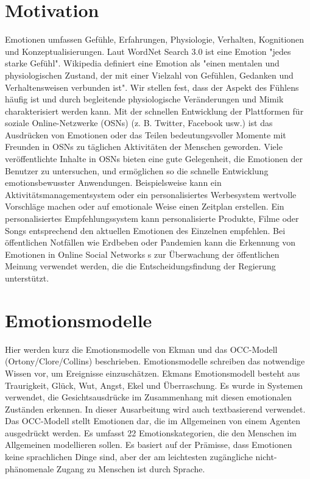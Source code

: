 \documentclass[conference]{IEEEtran}
\begin{document}
\section{Motivation}
Emotionen umfassen Gefühle, Erfahrungen, Physiologie, Verhalten, Kognitionen und Konzeptualisierungen. Laut WordNet Search 3.0 ist eine Emotion "jedes starke Gefühl". Wikipedia definiert eine Emotion als "einen mentalen und physiologischen Zustand, der mit einer Vielzahl von Gefühlen, Gedanken und Verhaltensweisen verbunden ist". Wir stellen fest, dass der Aspekt des Fühlens häufig ist und durch begleitende physiologische Veränderungen und Mimik charakterisiert werden kann.\cite{b2}
Mit der schnellen Entwicklung der Plattformen für soziale Online-Netzwerke (OSNs) (z. B. Twitter, Facebook usw.) ist das Ausdrücken von Emotionen oder das Teilen bedeutungsvoller Momente mit Freunden in OSNs zu täglichen Aktivitäten der Menschen geworden.
Viele veröffentlichte Inhalte in OSNs bieten eine gute Gelegenheit, die Emotionen der Benutzer zu untersuchen, und ermöglichen so die schnelle Entwicklung emotionsbewusster Anwendungen.
Beispielsweise kann ein Aktivitätsmanagementsystem oder ein personalisiertes Werbesystem wertvolle Vorschläge machen oder auf emotionale Weise einen Zeitplan erstellen. Ein personalisiertes Empfehlungssystem kann personalisierte Produkte, Filme oder Songs entsprechend den aktuellen Emotionen des Einzelnen empfehlen. 
Bei öffentlichen Notfällen wie Erdbeben oder Pandemien kann die Erkennung von Emotionen in Online Social Networks s zur Überwachung der öffentlichen Meinung verwendet werden, die die Entscheidungsfindung der Regierung unterstützt.\cite{b1}

\section{Emotionsmodelle}
Hier werden kurz die Emotionsmodelle von Ekman und das OCC-Modell (Ortony/Clore/Collins) beschrieben. 
Emotionsmodelle schreiben das notwendige Wissen vor, um Ereignisse einzuschätzen. Ekmans Emotionsmodell besteht aus Traurigkeit, Glück, Wut, Angst, Ekel und Überraschung. Es wurde in Systemen verwendet, die Gesichtsausdrücke im Zusammenhang mit diesen emotionalen Zuständen erkennen. In dieser Ausarbeitung wird auch textbasierend verwendet. Das OCC-Modell stellt Emotionen dar, die im Allgemeinen von einem Agenten ausgedrückt werden. Es umfasst 22 Emotionskategorien, die den Menschen im Allgemeinen modellieren sollen. Es basiert auf der Prämisse, dass Emotionen keine sprachlichen Dinge sind, aber der am leichtesten zugängliche nicht-phänomenale Zugang zu Menschen ist durch Sprache.
\end{document}
